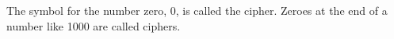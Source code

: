 The symbol for the number zero, 0, is called the cipher.
Zeroes at the end of a number like 1000 are called ciphers.